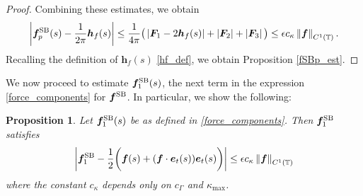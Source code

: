 \documentclass[11pt]{article}
\numberwithin{equation}{section}
\newcommand{\T}{\mathbb{T}}
\newcommand{\be}{\bm{e}}
\newcommand{\SB}{{\rm SB}}
\newcommand{\abs}[1]{\left\lvert #1 \right\rvert}
\newcommand{\norm}[1]{\left\lVert #1 \right\rVert}
\newtheorem{proposition}[theorem]{Proposition}
\theoremstyle{definition}
\begin{document}
\begin{proof}
 Combining these estimates, we obtain 
 \begin{equation}\label{fSBp_est0}
 \abs{\bm{f}^{\SB}_p(s)- \frac{1}{2\pi}\bm{h}_f(s)} \le \frac{1}{4\pi}\big(\abs{\bm{F}_1- 2\bm{h}_f(s)} +\abs{\bm{F}_2} +\abs{\bm{F}_3}\big) \le \epsilon c_\kappa\norm{\bm{f}}_{C^1(\T)}.
 \end{equation}
Recalling the definition of $\bm{h}_f(s)$ \eqref{hf_def}, we obtain Proposition \ref{fSBp_est}.
 \end{proof}

We now proceed to estimate $\bm{f}^{\SB}_1(s)$, the next term in the expression \eqref{force_components} for $\bm{f}^{\SB}$. In particular, we show the following:
\begin{proposition}\label{fSB1_est}
Let $\bm{f}^{\SB}_1(s)$ be as defined in \eqref{force_components}. Then $\bm{f}^{\SB}_1$ satisfies 
\begin{equation}
\abs{\bm{f}^{\SB}_1 - \frac{1}{2}\bigg(\bm{f}(s) + (\bm{f}\cdot\be_t(s))\be_t(s)\bigg) } \le \epsilon c_\kappa\norm{\bm{f}}_{C^1(\T)}
\end{equation}
where the constant $c_\kappa$ depends only on $c_{\Gamma}$ and $\kappa_{\max}$.
\end{proposition}
\end{document}

